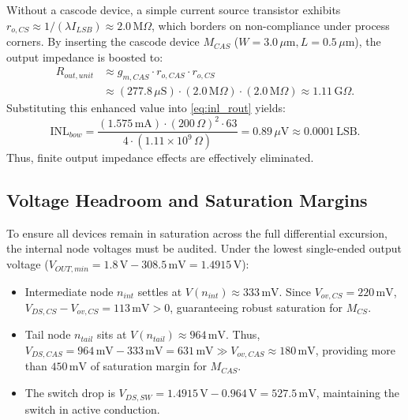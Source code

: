 \documentclass[conference,10pt]{IEEEtran}
\begin{document}
Without a cascode device, a simple current source transistor exhibits $r_{o,CS} \approx 1/(\lambda I_{LSB}) \approx 2.0\,\text{M}\Omega$, which borders on non-compliance under process corners. By inserting the cascode device $M_{CAS}$ ($W=3.0\,\mu\text{m}, L=0.5\,\mu\text{m}$), the output impedance is boosted to:
\begin{align}
R_{out,unit} &\approx g_{m,CAS} \cdot r_{o,CAS} \cdot r_{o,CS} \nonumber \\
&\approx (277.8\,\mu\text{S}) \cdot (2.0\,\text{M}\Omega) \cdot (2.0\,\text{M}\Omega) \approx 1.11\,\text{G}\Omega.
\end{align}
Substituting this enhanced value into \eqref{eq:inl_rout} yields:
\begin{equation}
\text{INL}_{bow} = \frac{(1.575\,\text{mA}) \cdot (200\,\Omega)^2 \cdot 63}{4 \cdot (1.11 \times 10^9\,\Omega)} = 0.89\,\mu\text{V} \approx 0.0001\,\text{LSB}.
\end{equation}
Thus, finite output impedance effects are effectively eliminated.

\subsection{Voltage Headroom and Saturation Margins}
To ensure all devices remain in saturation across the full differential excursion, the internal node voltages must be audited. Under the lowest single-ended output voltage ($V_{OUT,min} = 1.8\,\text{V} - 308.5\,\text{mV} = 1.4915\,\text{V}$):
\begin{itemize}
    \item Intermediate node $n_{int}$ settles at $V(n_{int}) \approx 333\,\text{mV}$. Since $V_{ov,CS} = 220\,\text{mV}$, $V_{DS,CS} - V_{ov,CS} = 113\,\text{mV} > 0$, guaranteeing robust saturation for $M_{CS}$.
    \item Tail node $n_{tail}$ sits at $V(n_{tail}) \approx 964\,\text{mV}$. Thus, $V_{DS,CAS} = 964\,\text{mV} - 333\,\text{mV} = 631\,\text{mV} \gg V_{ov,CAS} \approx 180\,\text{mV}$, providing more than $450\,\text{mV}$ of saturation margin for $M_{CAS}$.
    \item The switch drop is $V_{DS,SW} = 1.4915\,\text{V} - 0.964\,\text{V} = 527.5\,\text{mV}$, maintaining the switch in active conduction.
\end{itemize}
\end{document}
